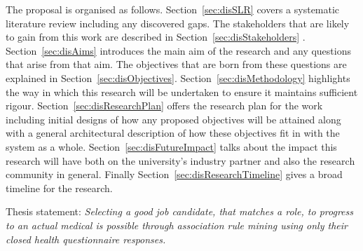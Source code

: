 The proposal is organised as follows. Section~\ref{sec:disSLR} covers a systematic literature review including any discovered gaps. The stakeholders that are likely to gain from this work are described in Section~\ref{sec:disStakeholders}
. Section~\ref{sec:disAims} introduces the main aim of the research and any questions that arise from that aim.
The objectives that are born from these questions are explained in Section~\ref{sec:disObjectives}. Section~\ref{sec:disMethodology} highlights the way in which this research will be undertaken to ensure it maintains sufficient rigour. Section~\ref{sec:disResearchPlan} offers the research plan for the work including initial designs of how any proposed objectives will be attained along with a general architectural description of how these objectives fit in with the system as a whole.   Section~\ref{sec:disFutureImpact} talks about the impact this research will have both on the university's industry partner and also the research community in general. Finally Section~\ref{sec:disResearchTimeline} gives a broad timeline for the research.



\par
\noindent
Thesis statement: \textit{Selecting a good job candidate, that matches a role, to progress to an actual medical is possible through association rule mining using only their closed health questionnaire responses.}


